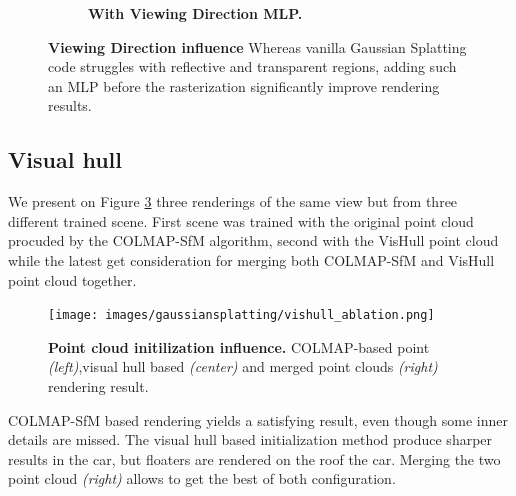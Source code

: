 \begin{figure}[htb!]
\begin{subfigure}[b]{0.48\linewidth}
    \caption{\textbf{With Viewing Direction MLP.}}
    \label{fig:gs-view3-gs}
  \end{subfigure}
  \caption{\textbf{Viewing Direction influence} Whereas vanilla Gaussian Splatting code struggles with reflective and transparent regions, adding such an MLP before the rasterization significantly improve rendering results. }
  \label{fig:gs-vh}
\end{figure}



\subsection{Visual hull} 

We present on Figure \ref{fig:gs-vishull-comp} three renderings of the same view but from three different trained scene. First scene was trained with the original point cloud procuded by the COLMAP-SfM algorithm, second with the VisHull point cloud while the latest get consideration for merging both COLMAP-SfM and VisHull point cloud together.   



\begin{figure}[htb!]
  \center
\texttt{[image: images/gaussiansplatting/vishull\_ablation.png]}
\caption{\textbf{Point cloud initilization influence.} COLMAP-based point \textit{(left)},visual hull based \textit{(center)} and merged point clouds \textit{(right)}  rendering result.}
\label{fig:gs-vishull-comp}
\end{figure}


COLMAP-SfM based rendering yields a satisfying result, even though some inner details are missed. The visual hull based initialization method produce sharper results in the car, but floaters are rendered on the roof the car. Merging the two point cloud \textit{(right)} allows to get the best of both configuration. 


